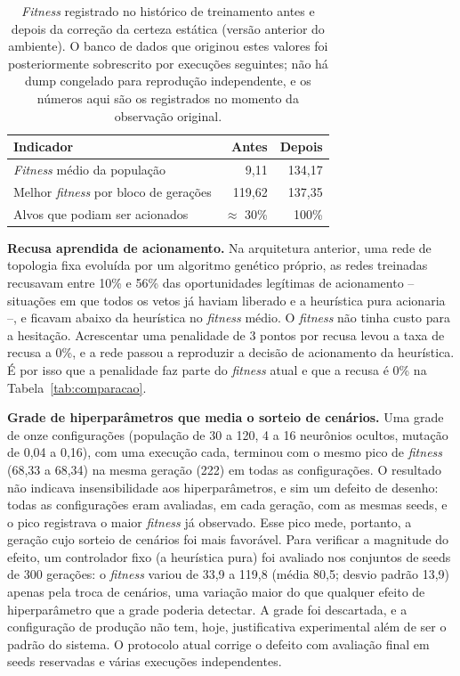 \documentclass[12pt,a4paper]{article}
\begin{document}
\begin{table}[H]
  \centering
  \caption{\textit{Fitness} registrado no histórico de treinamento antes e depois da correção da
  certeza estática (versão anterior do ambiente). O banco de dados que originou estes valores foi
  posteriormente sobrescrito por execuções seguintes; não há dump congelado para reprodução
  independente, e os números aqui são os registrados no momento da observação original.}
  \label{tab:certeza}
  \small
  \begin{tabular}{@{}lrr@{}}
    \toprule
    \textbf{Indicador} & \textbf{Antes} & \textbf{Depois} \\
    \midrule
    \textit{Fitness} médio da população & 9,11 & 134,17 \\
    Melhor \textit{fitness} por bloco de gerações & 119,62 & 137,35 \\
    Alvos que podiam ser acionados & $\approx$ 30\% & 100\% \\
    \bottomrule
  \end{tabular}
\end{table}

\textbf{Recusa aprendida de acionamento.} Na arquitetura anterior, uma rede de topologia fixa
evoluída por um algoritmo genético próprio, as redes treinadas recusavam entre 10\% e 56\% das
oportunidades legítimas de acionamento -- situações em que todos os vetos já haviam liberado e a
heurística pura acionaria --, e ficavam abaixo da heurística no \textit{fitness} médio. O
\textit{fitness} não tinha custo para a hesitação. Acrescentar uma penalidade de 3 pontos por recusa
levou a taxa de recusa a 0\%, e a rede passou a reproduzir a decisão de acionamento da heurística.
É por isso que a penalidade faz parte do \textit{fitness} atual e que a recusa é 0\% na
Tabela~\ref{tab:comparacao}.

\textbf{Grade de hiperparâmetros que media o sorteio de cenários.} Uma grade de onze configurações
(população de 30 a 120, 4 a 16 neurônios ocultos, mutação de 0,04 a 0,16), com uma execução cada,
terminou com o mesmo pico de \textit{fitness} (68,33 a 68,34) na mesma geração (222) em todas as
configurações. O resultado não indicava insensibilidade aos hiperparâmetros, e sim um defeito de
desenho: todas as configurações eram avaliadas, em cada geração, com as mesmas seeds, e o pico
registrava o maior \textit{fitness} já observado. Esse pico mede, portanto, a geração cujo sorteio
de cenários foi mais favorável. Para verificar a magnitude do efeito, um controlador fixo (a
heurística pura) foi avaliado nos conjuntos de seeds de 300 gerações: o \textit{fitness} variou de
33,9 a 119,8 (média 80,5; desvio padrão 13,9) apenas pela troca de cenários, uma variação maior do
que qualquer efeito de hiperparâmetro que a grade poderia detectar. A grade foi descartada, e a
configuração de produção não tem, hoje, justificativa experimental além de ser o padrão do sistema.
O protocolo atual corrige o defeito com avaliação final em seeds reservadas e várias execuções
independentes.
\end{document}
